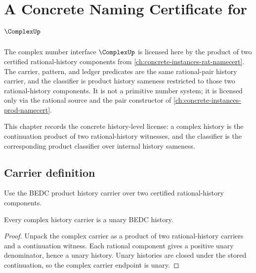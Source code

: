 \chapter{A Concrete Naming Certificate for \(\ComplexUp\)}
\label{ch:concrete-instances-complex-namecert}

The complex number interface \(\ComplexUp\) is licensed here by the product of two certified rational-history components from \autoref{ch:concrete-instances-rat-namecert}. The carrier, pattern, and ledger predicates are the same rational-pair history carrier, and the classifier is product history sameness restricted to those two rational-history components. It is not a primitive number system; it is licensed only via the rational source and the pair constructor of \autoref{ch:concrete-instances-prod-namecert}.

\begin{remark}
\label{rem:concrete-instances-complex-namecert-roadmap}
This chapter records the concrete history-level license: a complex history is
the continuation product of two rational-history witnesses, and the classifier
is the corresponding product classifier over internal history sameness.
\end{remark}

\section{Carrier definition}

\begin{definition}
\label{def:complex-carrier}
Use the BEDC product history carrier over two certified rational-history
components.
\end{definition}

\begin{theorem}
\label{thm:complex-history-carrier-unary}
Every complex history carrier is a unary BEDC history.
\end{theorem}
\begin{proof}
Unpack the complex carrier as a product of two rational-history carriers and a
continuation witness. Each rational component gives a positive unary
denominator, hence a unary history. Unary histories are closed under the stored
continuation, so the complex carrier endpoint is unary.
\end{proof}

